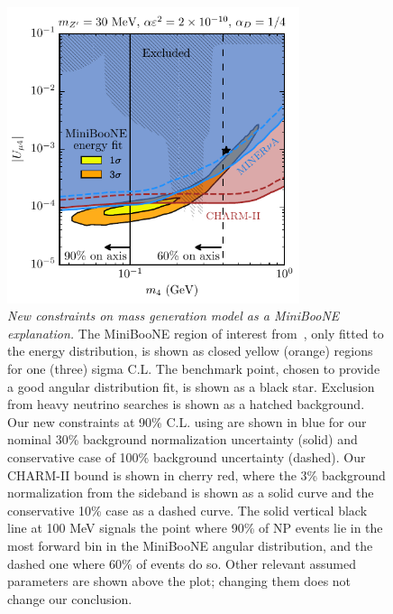 %
\begin{figure}[t]
    \centering
    \includegraphics[width=3.38in]{bounds.pdf}
    \caption[New constraints on dark neutrinos.]{{\textit{New constraints on mass generation model as a MiniBooNE explanation.}} The MiniBooNE region of interest from~\cite{Bertuzzo:2018itn}, only fitted to the energy distribution, is shown as closed yellow (orange) regions for one (three) sigma C.L. The benchmark point, chosen to provide a good angular distribution fit, is shown as a black star. Exclusion from heavy neutrino searches is shown as a hatched background. Our new constraints at 90\% C.L. using \minerva are shown in blue for our nominal 30\% background normalization uncertainty (solid) and conservative case of 100\% background uncertainty (dashed). Our CHARM-II bound is shown in cherry red, where the 3\% background normalization from the sideband is shown as a solid curve and the conservative 10\% case as a dashed curve. The solid vertical black line at 100 MeV signals the point where 90\% of NP events lie in the most forward bin in the MiniBooNE angular distribution, and the dashed one where 60\% of events do so. Other relevant assumed parameters are shown above the plot; changing them does not change our conclusion.}
    \label{fig:final_plot}
\end{figure}
%

